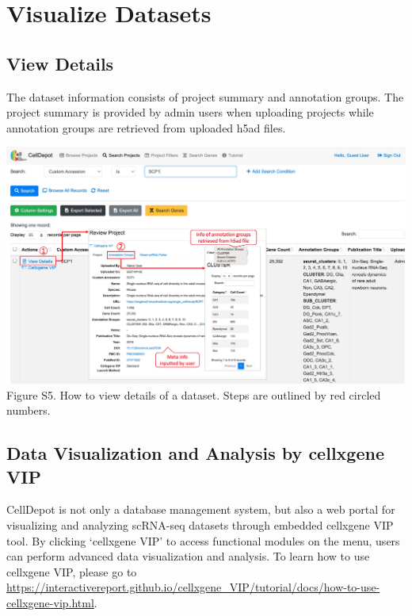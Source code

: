 \documentclass[
  openany]{book}
\begin{document}
\hypertarget{visualize-datasets}{%
\section{Visualize Datasets}\label{visualize-datasets}}

\hypertarget{view-details}{%
\subsection{View Details}\label{view-details}}

The dataset information consists of project summary and annotation groups. The project summary is provided by admin users when uploading projects while annotation groups are retrieved from uploaded h5ad files.

\href{figures/S5.jpg}{\includegraphics{figures/S5.jpg}}
Figure S5. How to view details of a dataset. Steps are outlined by red circled numbers.

\hypertarget{figures6}{%
\subsection{Data Visualization and Analysis by cellxgene VIP}\label{figures6}}

CellDepot is not only a database management system, but also a web portal for visualizing and analyzing scRNA-seq datasets through embedded cellxgene VIP tool. By clicking `cellxgene VIP' to access functional modules on the menu, users can perform advanced data visualization and analysis. To learn how to use cellxgene VIP, please go to \url{https://interactivereport.github.io/cellxgene_VIP/tutorial/docs/how-to-use-cellxgene-vip.html}.
\end{document}

